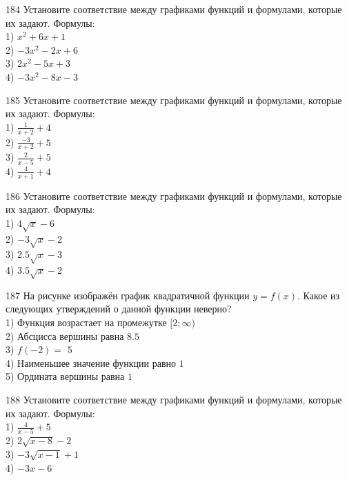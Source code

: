\documentclass[4apaper]{article}
\begin{document}
\begin{taskBN}{184}
Установите соответствие между графиками функций и формулами, которые их задают. Формулы: \\1) $x^2+6x+1$\\2) $-3x^2-2x+6$\\3) $2x^2-5x+3$\\4) $-3x^2-8x-3$
\end{taskBN}

\begin{taskBN}{185}
Установите соответствие между графиками функций и формулами, которые их задают. Формулы: \\1) $\frac{1}{x+2}+4$\\2) $\frac{-3}{x+2}+5$\\3) $\frac{2}{x-5}+5$\\4) $\frac{4}{x+1}+4$
\end{taskBN}

\begin{taskBN}{186}
Установите соответствие между графиками функций и формулами, которые их задают. Формулы: \\1) $4\sqrt{x}-6$\\2) $-3\sqrt{x}-2$\\3) $2.5\sqrt{x}-3$\\4) $3.5\sqrt{x}-2$
\end{taskBN}

\begin{taskBN}{187}
На рисунке изображён график квадратичной функции $y=f(x)$. Какое из следующих утверждений о данной функции неверно?\\1) Функция возрастает на промежутке $[2; \infty)$\\2) Абсцисса вершины равна $8.5$\\3) $f(-2)=$ $5$\\4) Наименьшее значение функции равно  $1$\\5) Ордината вершины равна $1$
\end{taskBN}

\begin{taskBN}{188}
Установите соответствие между графиками функций и формулами, которые их задают. Формулы: \\1) $\frac{4}{x-5}+5$\\2) $2\sqrt{x-8}-2$\\3) $-3\sqrt{x-1}+1$\\4) $-3x-6$
\end{taskBN}
\end{document}
